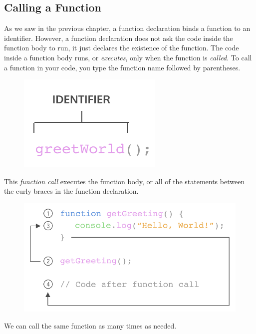\documentclass[11pt]{article}
\begin{document}
\newpage
\subsection{Calling a Function}
As we saw in the previous chapter, a function declaration binds a function to an identifier. However, a function declaration does not ask the code inside the function body to run, it just declares the existence of the function. The code inside a function body runs, or \textit{executes}, only when the function is \textit{called}. To call a function in your code, you type the function name followed by parentheses.
\vspace{-2mm}
\begin{figure}[H]
\includegraphics[scale = 0.65]{4_2}
\centering
\end{figure}
\vspace{-3mm}
This \textit{function call} executes the function body, or all of the statements between the curly braces in the function declaration.
\begin{figure}[H]
\includegraphics[scale = 0.6]{4_3}
\centering
\end{figure}
We can call the same function as many times as needed.
\end{document}
